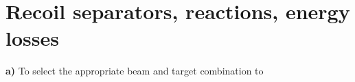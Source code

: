 \section{Recoil separators, reactions, energy losses}

\textbf{a)} To select the appropriate beam and target combination to 
\cite{beams}